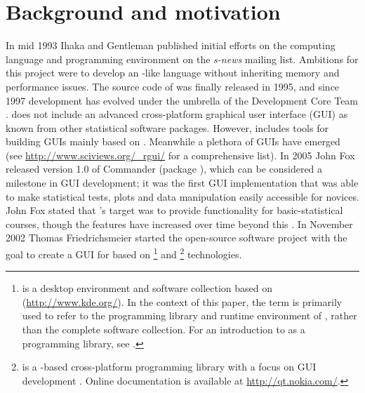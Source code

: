 \section{Background and motivation}
\label{background}
In mid 1993 Ihaka and Gentleman published initial efforts on the computing
language and programming environment  on the \emph{s-news} mailing list. Ambitions for
this project were to develop an -like language without inheriting memory
and performance issues. The source code of  was finally released in 1995, and 
since 1997 development has evolved under the umbrella of the  
Development Core Team \citep{RDCT2001, RDCT2010, Ihaka_Gentlemen_1993}.
 does not include an advanced cross-platform graphical user interface (GUI) as known from other
statistical software packages. However,  includes tools for building GUIs
mainly based on  \citep{Dalgaard2001, Dalgaard2002}. Meanwhile a
plethora of  GUIs have emerged (see \url{http://www.sciviews.org/_rgui/} for a
comprehensive list). In 2005 John Fox released version 1.0 of  Commander (package ), which
can be considered a milestone in  GUI development; it was the first GUI
implementation that was able to make statistical tests,
plots and data manipulation easily accessible for  novices.
John Fox stated that 's target was to provide
functionality for basic-statistical courses, though the features have increased over
time beyond this \citep{Fox2005, Fox2007}. In November 2002 Thomas Friedrichsmeier
started the  open-source software project with the goal to create a GUI for
 based on \footnote{
   is a desktop environment and software collection based on  (\url{http://www.kde.org/}).
  In the context of this paper, the term  is primarily used to refer to the programming library and
  runtime environment of , rather than the complete software collection. For an introduction to
   as a programming library, see \cite{Faure2000}.
} and \footnote{
   is a -based cross-platform programming library with a focus on GUI development
  \citep{BlanchetteSummerfield2008}. Online documentation is available at \url{http://qt.nokia.com/}.
} technologies.

